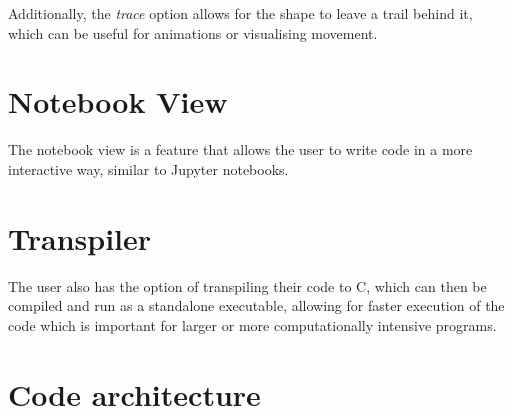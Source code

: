 Additionally, the \textit{trace} option allows for the shape to leave a trail behind it, which can be useful for
animations or visualising movement.

\section{Notebook View}\label{sec:notebook-view}

The notebook view is a feature that allows the user to write code in a more interactive way, similar to Jupyter
notebooks\citep{Jupyter}.

\section{Transpiler}\label{sec:transpiler}

The user also has the option of transpiling their code to C, which can then be compiled and run as a standalone
executable, allowing for faster execution of the code which is important for larger or more computationally
intensive programs.

\section{Code architecture}\label{sec:code-architecture}